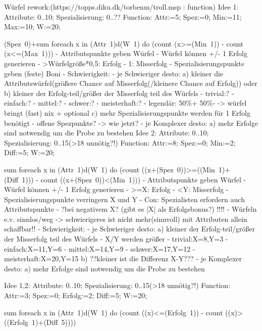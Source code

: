 		
		
		
		
		
		
		
		
		
		
		
Würfel rework:(https://topps.diku.dk/torbenm/troll.msp : function)
	Idee 1: Attribute: 0..10; Spezialisierung: 0..??
Function:
	Attr:=5;
	Spez:=0;
	Min:=11;
	Max:=10;
	W:=20;

	(Spez~0)+sum foreach x in (Attr~1)d(W~1) do (count (x>=(Min~1)) - count (x<=(Max~1)))
		- Attributspunkte geben Würfel
			- Würfel können +/- 1 Erfolg generieren
			- >Würfelgröße*0,5: Erfolg
			- 1: Misserfolg
		- Spezialisierungspunkte geben (feste) Boni
		- Schwierigkeit:
			- je Schwieriger desto:
				a) kleiner die Attributswürfel(größere Chance auf Misserfolg(/kleinere Chance auf Erfolg))
				oder b) kleiner der Erfolg-teil/größer der Misserfolg teil des Würfels
					- trivial:?
					- einfach:?
					- mittel:?
					- schwer:?
					- meisterhaft:?
					- legendär: 50\%+ 50\%- -> würfel bringt (fast) nix
				+ optional c) mehr Spezialisierungspunkte werden für 1 Erfolg benötigt
					- offene Spezpunkte?
						-> wie jetzt?
			- je Komplexer desto:
				a) mehr Erfolge sind notwendig um die Probe zu bestehen
	Idee 2: Attribute: 0..10; Spezialisierung: 0..15(>18 unnötig?!)
Function:
	Attr:=8;
	Spez:=0;
	Min:=2;
	Diff:=5;
	W:=20;

	sum foreach x in (Attr~1)d(W~1) do (count ((x+(Spez~0))>=((Min~1)+(Diff~1))) - count ((x+(Spez~0))<(Min~1)))
		- Attributspunkte geben Würfel
			- Würfel können +/- 1 Erfolg generieren
			- >=X: Erfolg
			- <Y: Misserfolg
		- Spezialisierungspunkte verringern X und Y
			- Con: Spezialisten erfordern auch Attributspunkte
			- ?bei negativem X? (gibt es |X| als Erfolgsbonus?)
!!!!			- Würfeln e.v. sinnlos/weg -> schwierigeres ist nicht mehr(sinnvoll) mit Attributen allein schaffbar!!
		- Schwierigkeit:
			- je Schwieriger desto:
				a) kleiner der Erfolg-teil/größer der Misserfolg teil des Würfels
					- X/Y werden größer
					- trivial:X=8,Y=3
					- einfach:X=11,Y=6
					- mittel:X=14,Y=9
					- schwer:X=17,Y=12
					- meisterhaft:X=20,Y=15
				b) ??kleiner ist die Differenz X-Y???
			- je Komplexer desto:
				a) mehr Erfolge sind notwendig um die Probe zu bestehen
				
	Idee 1,2: Attribute: 0..10; Spezialisierung: 0..15(>18 unnötig?!)
Function:
	Attr:=3;
	Spez:=0;
	Erfolg:=2;
	Diff:=5;
	W:=20;

	sum foreach x in (Attr~1)d(W~1) do (count ((x)<=(Erfolg~1)) - count ((x)>((Erfolg~1)+(Diff~5))))

